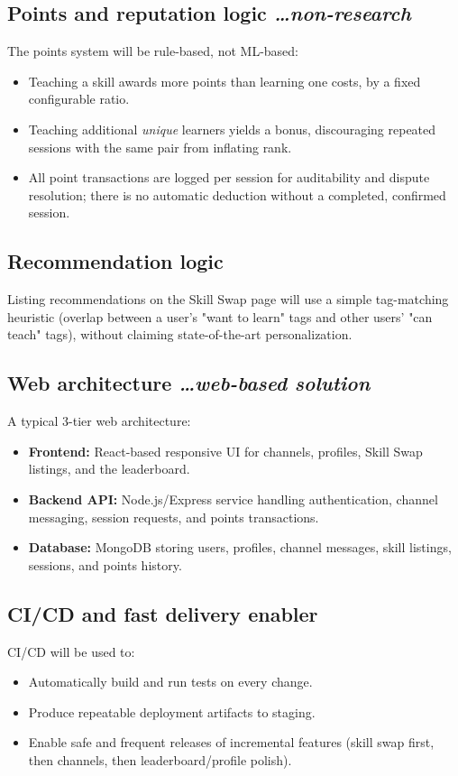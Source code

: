 \documentclass[11pt,a4paper]{article}
\newcommand{\BvrHint}[1]{%
  {\normalfont\normalsize\itshape\hfill #1}}
\begin{document}
\subsection{Points and reputation logic %
\BvrHint{\ldots non-research}}
The points system will be rule-based, not ML-based:
\begin{itemize}[leftmargin=0.7cm]
    \item Teaching a skill awards more points than learning one costs, by a fixed configurable ratio.
    \item Teaching additional \emph{unique} learners yields a bonus, discouraging repeated sessions with the same pair from inflating rank.
    \item All point transactions are logged per session for auditability and dispute resolution; there is no automatic deduction without a completed, confirmed session.
\end{itemize}

\subsection{Recommendation logic}
Listing recommendations on the Skill Swap page will use a simple tag-matching heuristic (overlap between a user's "want to learn" tags and other users' "can teach" tags), without claiming state-of-the-art personalization.

\subsection{Web architecture %
\BvrHint{\ldots web-based solution}}
A typical 3-tier web architecture:
\begin{itemize}[leftmargin=0.7cm]
    \item \textbf{Frontend:} React-based responsive UI for channels, profiles, Skill Swap listings, and the leaderboard.
    \item \textbf{Backend API:} Node.js/Express service handling authentication, channel messaging, session requests, and points transactions.
    \item \textbf{Database:} MongoDB storing users, profiles, channel messages, skill listings, sessions, and points history.
\end{itemize}

\subsection{CI/CD and fast delivery enabler}
CI/CD will be used to:
\begin{itemize}[leftmargin=0.7cm]
    \item Automatically build and run tests on every change.
    \item Produce repeatable deployment artifacts to staging.
    \item Enable safe and frequent releases of incremental features (skill swap first, then channels, then leaderboard/profile polish).
\end{itemize}
\end{document}

